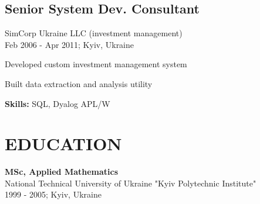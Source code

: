 \documentclass[a4paper,10pt]{article}
\begin{document}
\subsection*{Senior System Dev. Consultant}
SimCorp Ukraine LLC (investment management) \\
Feb 2006 - Apr 2011; Kyiv, Ukraine \\
\begin{bulletlist}
    \item Developed custom investment management system
    \item Built data extraction and analysis utility
\end{bulletlist}
\textbf{Skills:} SQL, Dyalog APL/W

\section*{EDUCATION}
\textbf{MSc, Applied Mathematics} \\
National Technical University of Ukraine "Kyiv Polytechnic Institute" \\
1999 - 2005; Kyiv, Ukraine \\
\end{document}
